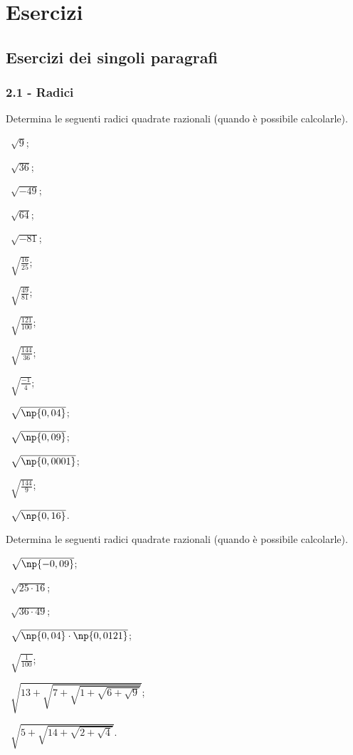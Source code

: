 \section{Esercizi}
\subsection{Esercizi dei singoli paragrafi}
\subsubsection*{2.1 - Radici}


\begin{esercizio}
 \label{ese:2.1}
Determina le seguenti radici quadrate razionali (quando è possibile calcolarle).
\begin{multicols}{3}
 \begin{enumeratea}
 \item~$\sqrt 9$;
 \item~$\sqrt{36}$;
 \item~$\sqrt{-49}$;
 \item~$\sqrt{64}$;
 \item~$\sqrt{-81}$;
 \item~$\sqrt{\frac{16}{25}}$;
 \item~$\sqrt{\frac{49}{81}}$;
 \item~$\sqrt{\frac{121}{100}}$;
 \item~$\sqrt{\frac{144}{36}}$;
 \item~$\sqrt{\frac{-1} 4}$;
 \item~$\sqrt{\np{0,04}}$;
 \item~$\sqrt{\np{0,09}}$;
 \item~$\sqrt{\np{0,0001}}$;
 \item~$\sqrt{\frac{144} 9}$;
 \item~$\sqrt{\np{0,16}}$.
 \end{enumeratea}
 \end{multicols}
\end{esercizio}

\begin{esercizio}[\Ast]
 \label{ese:2.2}
Determina le seguenti radici quadrate razionali (quando è possibile calcolarle).
\begin{multicols}{2}
 \begin{enumeratea}
 \item~$\sqrt{\np{-0,09}}$;
 \item~$\sqrt{25\cdot 16}$;
 \item~$\sqrt{36\cdot 49}$;
 \item~$\sqrt{\np{0,04}\cdot \np{0,0121}}$;
 \item~$\sqrt{\frac 1{100}}$;
 \item~$\sqrt{13+\sqrt{7+\sqrt{1+\sqrt{6+\sqrt 9}}}}$;
 \item~$\sqrt{5+\sqrt{14+\sqrt{2+\sqrt 4}}}$.
 \end{enumeratea}
 \end{multicols}
\end{esercizio}

